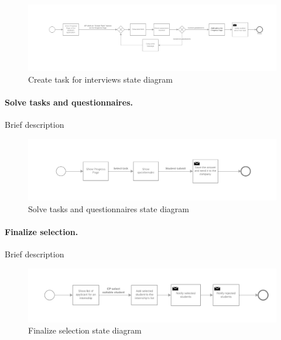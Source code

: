 \begin{figure}[H]
    \begin{center}
        \includegraphics[width=1\linewidth]{RASD/LaTeX/Images/StateDiagrams/create_task_for_interviews.png}
        \caption{Create task for interviews state diagram}
        \label{fig:create_task_for_interviews_sd}%
    \end{center}
\end{figure}

\paragraph{Solve tasks and questionnaires.}
Brief description

\begin{figure}[H]
    \begin{center}
        \includegraphics[width=1\linewidth]{RASD/LaTeX/Images/StateDiagrams/solve_tasks_and_questionnaires.png}
        \caption{Solve tasks and questionnaires state diagram}
        \label{fig:solve_tasks_and_questionnaires_sd}%
    \end{center}
\end{figure}

\paragraph{Finalize selection.}
Brief description

\begin{figure}[H]
    \begin{center}
        \includegraphics[width=1\linewidth]{RASD/LaTeX/Images/StateDiagrams/finalize_selections.png}
        \caption{Finalize selection state diagram}
        \label{fig:finalize_selections_sd}%
    \end{center}
\end{figure}

